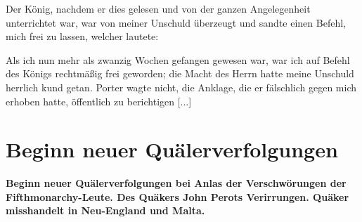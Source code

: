 Der König, nachdem er dies gelesen und von der ganzen
Angelegenheit unterrichtet war, war von meiner Unschuld überzeugt 
und sandte einen Befehl, mich frei zu lassen, welcher lautete:


Als ich nun mehr als zwanzig Wochen gefangen gewesen
war, war ich auf Befehl des Königs rechtmäßig frei geworden;
die Macht des Herrn hatte meine Unschuld herrlich kund getan.
Porter wagte nicht, die Anklage, die er fälschlich gegen mich
erhoben hatte, öffentlich zu berichtigen [...]

\chapter[Beginn neuer Quälerverfolgungen]{Beginn neuer Quälerverfolgungen}

\begin{center}
\textbf{Beginn neuer Quälerverfolgungen bei Anlas der Verschwörungen
der Fifthmonarchy-Leute. Des Quäkers John Perots Verirrungen.
Quäker misshandelt in Neu-England und Malta.}
\end{center}

